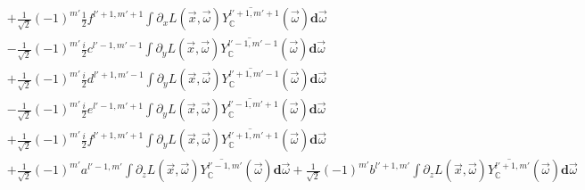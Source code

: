 \begin{align*}
\\&
+\frac{1}{\sqrt{2}}\left({-1}\right)^{m'}\frac{1}{2}f^{{l'+1,m'+1}}\int{\partial_xL\left (\vec{x} ,\vec{\omega} \right )\overline{Y_{\mathbb{C}}^{l'+1, m'+1}}(\vec{\omega} )\mathbf{d}\vec{\omega}}
\\&
-\frac{1}{\sqrt{2}}\left({-1}\right)^{m'}\frac{i}{2}c^{{l'-1,m'-1}}\int{\partial_yL\left (\vec{x} ,\vec{\omega} \right )\overline{Y_{\mathbb{C}}^{l'-1, m'-1}}(\vec{\omega} )\mathbf{d}\vec{\omega}}
\\&
+\frac{1}{\sqrt{2}}\left({-1}\right)^{m'}\frac{i}{2}d^{{l'+1,m'-1}}\int{\partial_yL\left (\vec{x} ,\vec{\omega} \right )\overline{Y_{\mathbb{C}}^{l'+1, m'-1}}(\vec{\omega} )\mathbf{d}\vec{\omega}}
\\&
-\frac{1}{\sqrt{2}}\left({-1}\right)^{m'}\frac{i}{2}e^{{l'-1,m'+1}}\int{\partial_yL\left (\vec{x} ,\vec{\omega} \right )\overline{Y_{\mathbb{C}}^{l'-1, m'+1}}(\vec{\omega} )\mathbf{d}\vec{\omega}}
\\&
+\frac{1}{\sqrt{2}}\left({-1}\right)^{m'}\frac{i}{2}f^{{l'+1,m'+1}}\int{\partial_yL\left (\vec{x} ,\vec{\omega} \right )\overline{Y_{\mathbb{C}}^{l'+1, m'+1}}(\vec{\omega} )\mathbf{d}\vec{\omega}}
\\&
+\frac{1}{\sqrt{2}}\left({-1}\right)^{m'}a^{{l'-1,m'}}\int{\partial_zL\left (\vec{x} ,\vec{\omega} \right )\overline{Y_{\mathbb{C}}^{l'-1, m'}}(\vec{\omega} )\mathbf{d}\vec{\omega}}
+\frac{1}{\sqrt{2}}\left({-1}\right)^{m'}b^{{l'+1,m'}}\int{\partial_zL\left (\vec{x} ,\vec{\omega} \right )\overline{Y_{\mathbb{C}}^{l'+1, m'}}(\vec{\omega} )\mathbf{d}\vec{\omega}}
\end{align*}

